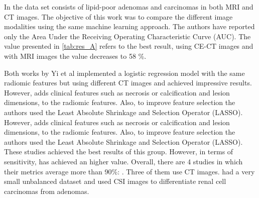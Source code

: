\documentclass{article}
\begin{document}
In \cite{Ho2019} the data set consists of lipid-poor adenomas and
carcinomas in both MRI and CT images. The objective of this work was to compare
the different image modalities using the same machine learning approach. The
authors have reported only the Area Under the Receiving Operating Characteristic
Curve (AUC). The value presented in \ref{tab:res_A} refers to the best result,
using CE-CT images and with MRI images the value decreases to 58 \%.

Both works by Yi et al \cite{Yi2018, Yi20181} implemented a logistic regression
model with the same radiomic features but using different CT images and achieved
impressive results. However, \cite{Yi2018} adds clinical features such as
necrosis or calcification and lesion dimensions, to the radiomic features. Also,
to improve feature selection the authors used the Least Absolute Shrinkage and
Selection Operator (LASSO).  However, \cite{Yi2018} adds clinical features such
as necrosis or calcification and lesion dimensions, to the radiomic features.
Also, to improve feature selection the authors used the Least Absolute Shrinkage
and Selection Operator (LASSO). These studies achieved the best results of this
group. However, in terms of sensitivity, \cite{Yi2018} has achieved an higher
value. Overall, there are 4 studies in which their metrics average more than
90\%: \cite{Yi2018, Yi20181, Kusunoki2022, Schieda2017}. Three of them use CT
images. \cite{Schieda2017} had a very small unbalanced dataset and used CSI
images to differentiate renal cell carcinomas from adenomas.  
\end{document}
